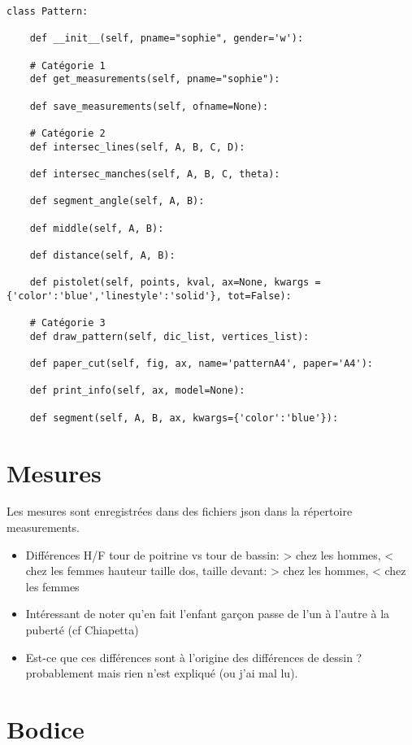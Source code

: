 \documentclass[11pt,a4paper]{article}
\begin{document}
\begin{verbatim}
class Pattern:

	def __init__(self, pname="sophie", gender='w'):
			
	# Catégorie 1		
	def get_measurements(self, pname="sophie"):
		
	def save_measurements(self, ofname=None):

	# Catégorie 2
	def intersec_lines(self, A, B, C, D):
	
	def intersec_manches(self, A, B, C, theta):

	def segment_angle(self, A, B):

	def middle(self, A, B):

	def distance(self, A, B):

	def pistolet(self, points, kval, ax=None, kwargs = {'color':'blue','linestyle':'solid'}, tot=False):
		
	# Catégorie 3	
	def draw_pattern(self, dic_list, vertices_list):

	def paper_cut(self, fig, ax, name='patternA4', paper='A4'):	

	def print_info(self, ax, model=None):

	def segment(self, A, B, ax, kwargs={'color':'blue'}):

\end{verbatim}
\section{Mesures}

Les mesures sont enregistrées dans des fichiers json dans la répertoire measurements.

\begin{itemize}

\item Différences H/F
\subitem tour de poitrine vs tour de bassin: > chez les hommes, < chez les femmes
\subitem hauteur taille dos, taille devant: > chez les hommes, < chez les femmes

\item Intéressant de noter qu'en fait l'enfant garçon passe de l'un à l'autre à la puberté (cf Chiapetta)

\item Est-ce que ces différences sont à l'origine des différences de dessin ? probablement mais rien n'est expliqué (ou j'ai mal lu).
\end{itemize}


\section{Bodice}  
\end{document}
